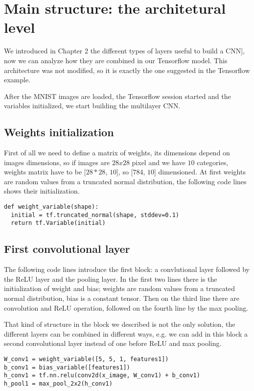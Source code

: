 \section{Main structure: the architetural level}

We introduced in Chapter 2 the different types of layers useful to build a \acs{CNN}], now we can analyze how they are combined in our Tensorflow model. This architecture was not modified, so it is exactly the one suggested in the Tensorflow example.

After the MNIST images are loaded, the Tensorflow session started and the variables initialized, we start building the multilayer \acs{CNN}.

\subsection{Weights initialization}

First of all we need to define a matrix of weights, its dimensions depend on images dimensions, so if images are $28x28$ pixel and we have $10$ categories, weights matrix have to be [$28*28$, $10$], so [$784$, $10$] dimensioned. At first weights are random values from a truncated normal distribution, the following code lines shows their initialization.

\begin{lstlisting}
def weight_variable(shape):
  initial = tf.truncated_normal(shape, stddev=0.1)
  return tf.Variable(initial)
\end{lstlisting}

\subsection{First convolutional layer}

The following code lines introduce the first block: a convlutional layer followed by the ReLU layer and the pooling layer. In the first two lines there is the initialization of weight and bias; weights are random values from a truncated normal distribution, bias is a constant tensor. Then on the third line there are convolution and ReLU operation, followed on the fourth line by the max pooling.

That kind of structure in the block we described is not the only solution, the different layers can be combined in different ways, e.g. we can add in this block a second convolutional layer instead of one before ReLU and max pooling.

\begin{lstlisting}
W_conv1 = weight_variable([5, 5, 1, features1])
b_conv1 = bias_variable([features1])
h_conv1 = tf.nn.relu(conv2d(x_image, W_conv1) + b_conv1)
h_pool1 = max_pool_2x2(h_conv1)
\end{lstlisting}

